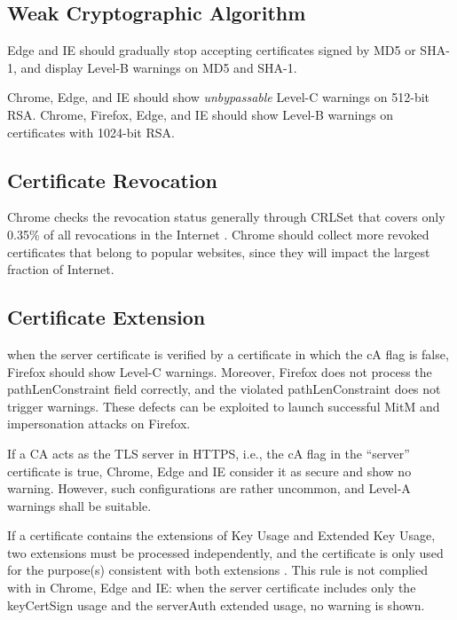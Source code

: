 \subsection{Weak Cryptographic Algorithm}
Edge and IE should gradually stop accepting certificates signed by MD5 or SHA-1, 
    and display Level-B warnings on MD5 and SHA-1.
    
Chrome, Edge, and IE should show \emph{unbypassable} Level-C warnings on 512-bit RSA.
Chrome, Firefox, Edge, and IE should show Level-B warnings on certificates with 1024-bit RSA.
\subsection{Certificate Revocation}
Chrome checks the revocation status
    generally through CRLSet \cite{CRLSet} that covers only 0.35\% of all revocations in the Internet \cite{liu2015end}.
Chrome should collect more revoked certificates that belong to popular websites, 
    since they will impact the largest fraction of Internet.
\subsection{Certificate Extension}
    when the server certificate is verified by a certificate in which the cA flag is false,
            Firefox should show Level-C warnings.
Moreover, Firefox does not process the pathLenConstraint field correctly,
    and the violated pathLenConstraint does not trigger warnings.
These defects can be exploited to launch successful MitM and impersonation attacks on Firefox.

If a CA acts as the TLS server in HTTPS,
    i.e., the cA flag in the ``server'' certificate is true,
Chrome, Edge and IE consider it as secure and show no warning.
However, %
    such configurations are rather uncommon,
    and Level-A warnings shall be suitable.

If a certificate contains the extensions of Key Usage and Extended Key Usage,
    two extensions must be processed independently,
    and the certificate is only used for the purpose(s) consistent with both extensions  \cite{cooper2008rfc5280}.
This rule is not complied with in Chrome, Edge and IE:
    when the server certificate includes only the keyCertSign usage and the serverAuth extended usage,
     no warning is shown.

